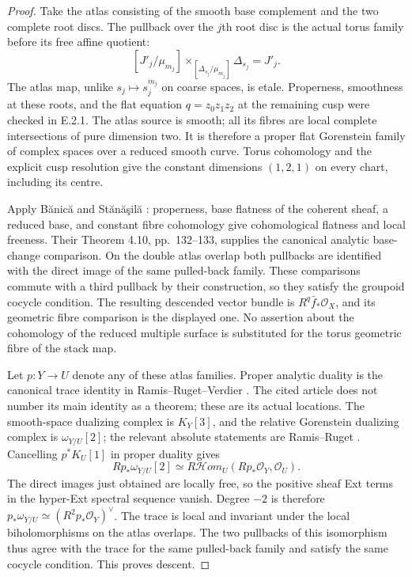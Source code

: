 \begin{proof}
Take the atlas consisting of the smooth base complement and the
two complete root discs.  The pullback over the $j$th root disc
is the actual torus family before its free affine quotient:
\[
 [J'_j/\mu_{m_j}]
 \mathbin{\times_{[\Delta_{s_j}/\mu_{m_j}]}}
 \Delta_{s_j}=J'_j.
\]
The atlas map, unlike $s_j\mapsto s_j^{m_j}$ on coarse spaces,
is etale.  Properness, smoothness at these roots, and the
flat equation $q=z_0z_1z_2$ at the remaining cusp were checked
in E.2.1.  The atlas source is smooth; all its fibres are local
complete intersections of pure dimension two.  It is therefore
a proper flat Gorenstein family of complex spaces over a reduced
smooth curve.  Torus cohomology and the explicit cusp resolution
give the constant dimensions $(1,2,1)$ on every chart, including
its centre.

Apply B\u anic\u a and St\u an\u a\c sil\u a
\cite[Chapter III, Theorem 4.12(ii), pp.~134--135]{BS76push}:
properness, base flatness of the coherent sheaf, a reduced base,
and constant fibre cohomology give cohomological flatness and
local freeness.  Their Theorem 4.10, pp.~132--133, supplies the
canonical analytic base-change comparison.  On the double atlas
overlap both pullbacks are identified with the direct image of
the same pulled-back family.  These comparisons commute with a
third pullback by their construction, so they satisfy the
groupoid cocycle condition.  The resulting descended vector
bundle is $R^q\bar f_*\mathcal O_X$, and its geometric fibre
comparison is the displayed one.  No assertion about the
cohomology of the reduced multiple surface is substituted for
the torus geometric fibre of the stack map.

Let $p:Y\to U$ denote any of these atlas families.  Proper analytic
duality is the canonical trace identity in
Ramis--Ruget--Verdier \cite[introduction, equation (1),
Section 1, pp.~264--265, and Proposition 2.1, p.~266]{RRV71push}.
The cited article does not number its main identity as a theorem;
these are its actual locations.  The smooth-space dualizing
complex is $K_Y[3]$, and the relative Gorenstein dualizing
complex is $\omega_{Y/U}[2]$; the relevant absolute statements
are Ramis--Ruget \cite[Section 3, Theorem 1, p.~81;
Proposition 2 and the complete-intersection calculation, p.~91]{RR70push}.
Cancelling $p^*K_U[1]$ in proper duality gives
\[
 Rp_*\omega_{Y/U}[2]
 \simeq R\mathcal Hom_U(Rp_*\mathcal O_Y,\mathcal O_U).
\]
The direct images just obtained are locally free, so the positive
sheaf Ext terms in the hyper-Ext spectral sequence vanish.
Degree $-2$ is therefore
$p_*\omega_{Y/U}\simeq(R^2p_*\mathcal O_Y)^\vee$.
The trace is local and invariant under the local biholomorphisms
on the atlas overlaps.  The two pullbacks of this isomorphism
thus agree with the trace for the same pulled-back family and
satisfy the same cocycle condition.  This proves descent.


\end{proof}
